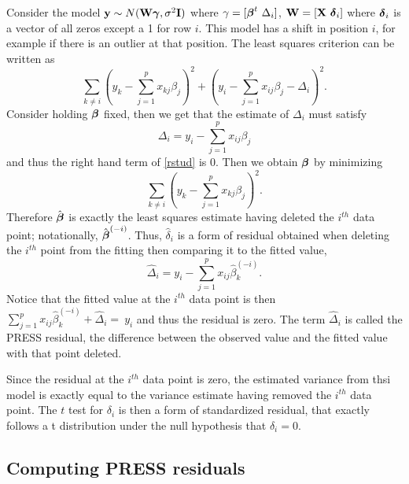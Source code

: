 Consider the model $\mathbf{y} \sim N(\mathbf{W} \boldsymbol{\gamma}, \sigma^2 \mathbf{I})$
where $\gamma = [\boldsymbol{\beta}^t ~ \Delta_i]$, 
$\mathbf{W} = [\mathbf{X} ~ \boldsymbol{\delta}_i]$ where $\boldsymbol{\delta}_i$ is a vector of all zeros
except a 1 for row $i$. This model has a shift in position $i$, for 
example if there is an outlier at that position. 
The least squares criterion can be written as
\begin{equation}
\label{rstud}
\sum_{k\neq i} \left(y_k - \sum_{j = 1}^p x_{kj} \beta_j \right)^2
+ \left(y_i - \sum_{j=1}^p x_{ij} \beta_j - \Delta_i\right)^2.
\end{equation}
Consider holding $\boldsymbol{\beta}$ fixed, then we get that the estimate of
$\Delta_i$ must satisfy
$$
\Delta_i = y_i - \sum_{j=1}^p x_{ij} \beta_j
$$
and thus the right hand term of \eqref{rstud} is 0. Then we obtain $\boldsymbol{\beta}$ by minimizing
$$
\sum_{k\neq i} \left(y_k - \sum_{j = 1}^p x_{kj} \beta_j \right)^2.
$$
Therefore $\hat {\boldsymbol{\beta}}$ is exactly the least squares estimate having
deleted the $i^{th}$ data point; notationally, $\hat{\boldsymbol{\beta}}^{(-i)}$. Thus, $\hat \delta_i$ 
is a form of residual obtained when deleting
the $i^{th}$ point from the fitting then comparing it to the fitted value, 
$$
\hat \Delta_i = y_i - \sum_{j=1}^p x_{ij} \hat \beta^{(-i)}_{k}.
$$
Notice that the fitted value at the $i^{th}$ data point is then 
$\sum_{j=1}^p x_{ij} \hat \beta^{(-i)}_{k} + \hat \Delta_i = \ y_i$ and thus
the residual is zero. The term $\hat \Delta_i$ is called the PRESS residual, the
difference between the observed value and the fitted value with that point deleted.

Since the residual at the $i^{th}$ data point is zero, the estimated variance from
thsi model is exactly equal to the variance estimate having removed the
$i^{th}$ data point. The $t$ test for $\delta_i$ is then a form of 
standardized residual, that exactly follows a t distribution under the null
hypothesis that $\delta_i = 0$. 

\subsection{Computing PRESS residuals}

